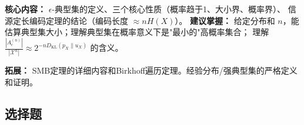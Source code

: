 \documentclass[12pt,a4paper]{ctexart}
\newcommand{\XX}{\mathcal{X}}
\newcommand{\DKL}{D_{\mathrm{KL}}}
\begin{document}
\begin{notetested}
\textbf{核心内容：} $\epsilon$-典型集的定义、三个核心性质（概率趋于1、大小界、概率界）、
信源定长编码定理的结论（编码长度 $\approx nH(X)$）。
\textbf{建议掌握：} 给定分布和 $n$，能估算典型集大小；理解典型集在概率意义下是"最小的"高概率集合；
理解 $\frac{|A_\epsilon^{(n)}|}{|\XX^n|} \approx 2^{-n\DKL(p_X\|u_X)}$ 的含义。
\end{notetested}

\begin{noteskipped}
\textbf{拓展：} SMB定理的详细内容和Birkhoff遍历定理。经验分布/强典型集的严格定义和证明。
\end{noteskipped}

\subsection*{选择题}
\end{document}
